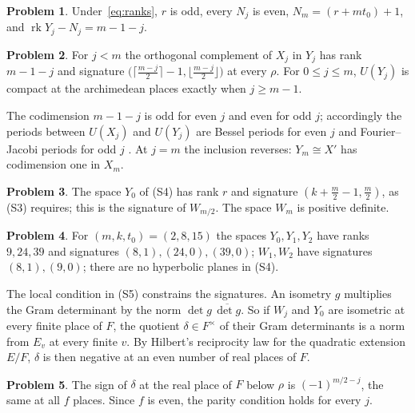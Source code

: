 \documentclass[reqno]{amsart}
\theoremstyle{definition}
\newtheorem{problem}{Problem}[section]
\theoremstyle{plain}
\theoremstyle{remark}
\begin{document}
\begin{problem}\label{pr:parity}
Under~\eqref{eq:ranks}, \(r\) is odd, every \(N_j\) is even, \(N_m=(r+mt_0)+1\), and \(\operatorname{rk}Y_j-N_j=m-1-j\).
\end{problem}

\begin{problem}\label{pr:complement}
For \(j<m\) the orthogonal complement of \(X_j\) in \(Y_j\) has rank \(m-1-j\) and signature \(\bigl(\lceil\frac{m-j}2\rceil-1,\lfloor\frac{m-j}2\rfloor\bigr)\) at every \(\rho\).  For \(0\le j\le m\), \(U(Y_j)\) is compact at the archimedean places exactly when \(j\ge m-1\).
\end{problem}

The codimension \(m-1-j\) is odd for even \(j\) and even for odd \(j\); accordingly the periods between \(U(X_j)\) and \(U(Y_j)\) are Bessel periods for even \(j\) and Fourier--Jacobi periods for odd \(j\) \cite[\S4.1]{Zh}.  At \(j=m\) the inclusion reverses: \(Y_m\cong X'\) has codimension one in \(X_m\).

\begin{problem}\label{pr:Y0}
The space \(Y_0\) of (S4) has rank \(r\) and signature \((k+\frac m2-1,\frac m2)\), as (S3) requires; this is the signature of \(W_{m/2}\).  The space \(W_m\) is positive definite.
\end{problem}

\begin{problem}\label{pr:instance-spaces}
For \((m,k,t_0)=(2,8,15)\) the spaces \(Y_0,Y_1,Y_2\) have ranks \(9,24,39\) and signatures \((8,1),(24,0),(39,0)\); \(W_1,W_2\) have signatures \((8,1),(9,0)\); there are no hyperbolic planes in (S4).
\end{problem}

The local condition in (S5) constrains the signatures.  An isometry \(g\) multiplies the Gram determinant by the norm \(\det g\,\overline{\det g}\).  So if \(W_j\) and \(Y_0\) are isometric at every finite place of \(F\), the quotient \(\delta\in F^\times\) of their Gram determinants is a norm from \(E_v\) at every finite \(v\).  By Hilbert's reciprocity law for the quadratic extension \(E/F\), \(\delta\) is then negative at an even number of real places of \(F\).

\begin{problem}\label{pr:local-global}
The sign of \(\delta\) at the real place of \(F\) below \(\rho\) is \((-1)^{m/2-j}\), the same at all \(f\) places.  Since \(f\) is even, the parity condition holds for every \(j\).
\end{problem}
\end{document}
